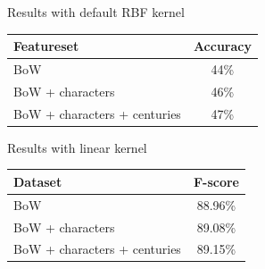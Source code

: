 \documentclass[10pt]{beamer}
\begin{document}
\begin{frame}[fragile]{Results with default RBF kernel}

\begin{tabular}{l c}
   Featureset & Accuracy \\
   \hline
   BoW & 44\% \\
   BoW + characters & 46\% \\
   BoW + characters + centuries & 47\% \\
\end{tabular}

\end{frame}
















\begin{frame}[fragile]{Results with linear kernel}

\begin{tabular}{l c}
  Dataset & F-score \\
  \hline
  BoW & 88.96\% \\
  BoW + characters & 89.08\% \\
  BoW + characters + centuries & 89.15\% \\

\end{tabular}

\end{frame}
\end{document}
